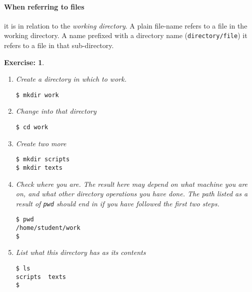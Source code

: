 \documentclass[12pt,a4paper]{article}
\newtheorem{exercise}{Exercise:}
\begin{document}
\paragraph{When referring to files} it is in relation to the \emph{working
directory}.  A plain file-name refers to a file in the working
directory.  A name prefixed with a directory name (\texttt{directory/file}) it
refers to a file in that sub-directory.

\begin{exercise}~\\[-1em]
\begin{enumerate}
\item {Create a directory} in which to work.
\begin{code}
\begin{verbatim}
$ mkdir work
\end{verbatim}
\end{code}
\item Change into that directory
	\begin{code}
\begin{verbatim}
$ cd work
\end{verbatim}
	\end{code}
\item Create two more
	\begin{code}
\begin{verbatim}
$ mkdir scripts
$ mkdir texts
\end{verbatim}
	\end{code}
\item Check where you are.   The result here may depend on what machine you are
	on, and what other directory operations you have done.  The path listed as
	a result of \verb'pwd' should end in  if you have followed the
	first two steps.
	\begin{code}
\begin{verbatim}
$ pwd
/home/student/work
$
\end{verbatim}
	\end{code}
\item List what this directory has as its contents
	\begin{code}
\begin{verbatim}
$ ls
scripts  texts
$
\end{verbatim}
	\end{code}
\end{enumerate}
\end{exercise}
\end{document}

